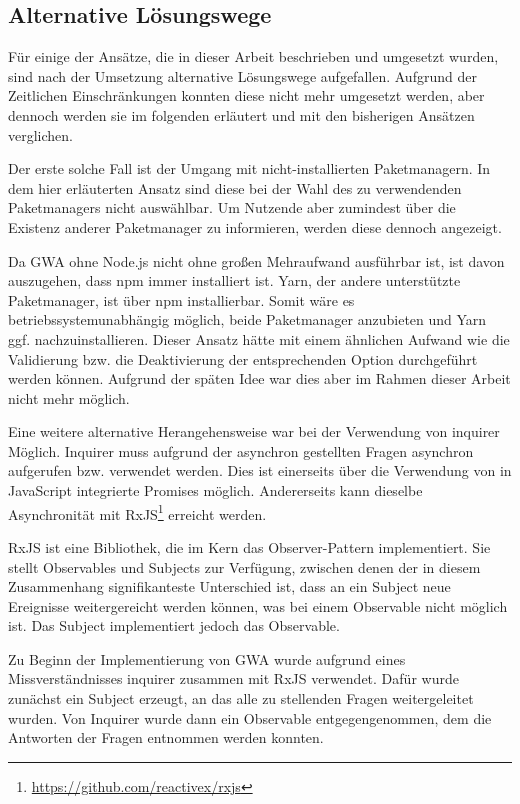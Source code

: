 \subsection{Alternative Lösungswege}
Für einige der Ansätze, die in dieser Arbeit beschrieben und umgesetzt wurden, sind nach der Umsetzung alternative Lösungswege aufgefallen. Aufgrund der Zeitlichen Einschränkungen konnten diese nicht mehr umgesetzt werden, aber dennoch werden sie im folgenden erläutert und mit den bisherigen Ansätzen verglichen.

Der erste solche Fall ist der Umgang mit nicht-installierten Paketmanagern. In dem hier erläuterten Ansatz sind diese bei der Wahl des zu verwendenden Paketmanagers nicht auswählbar. Um Nutzende aber zumindest über die Existenz anderer Paketmanager zu informieren, werden diese dennoch angezeigt.

Da \gls{GWA} ohne Node.js nicht ohne großen Mehraufwand ausführbar ist, ist davon auszugehen, dass \gls{npm} immer installiert ist. Yarn, der andere unterstützte Paketmanager, ist über \gls{npm} installierbar. Somit wäre es betriebssystemunabhängig möglich, beide Paketmanager anzubieten und Yarn ggf. nachzuinstallieren. Dieser Ansatz hätte mit einem ähnlichen Aufwand wie die Validierung bzw. die Deaktivierung der entsprechenden Option durchgeführt werden können. Aufgrund der späten Idee war dies aber im Rahmen dieser Arbeit nicht mehr möglich.

Eine weitere alternative Herangehensweise war bei der Verwendung von inquirer Möglich. Inquirer muss aufgrund der asynchron gestellten Fragen asynchron aufgerufen bzw. verwendet werden. Dies ist einerseits über die Verwendung von in JavaScript integrierte Promises möglich. Andererseits kann dieselbe Asynchronität mit RxJS\footnote{\url{https://github.com/reactivex/rxjs}} erreicht werden.

RxJS ist eine Bibliothek, die im Kern das Observer-Pattern implementiert. Sie stellt Observables und Subjects zur Verfügung, zwischen denen der in diesem Zusammenhang signifikanteste Unterschied ist, dass an ein Subject neue Ereignisse weitergereicht werden können, was bei einem Observable nicht möglich ist. Das Subject implementiert jedoch das Observable.

Zu Beginn der Implementierung von \gls{GWA} wurde aufgrund eines Missverständnisses inquirer zusammen mit RxJS verwendet. Dafür wurde zunächst ein Subject erzeugt, an das alle zu stellenden Fragen weitergeleitet wurden. Von Inquirer wurde dann ein Observable entgegengenommen, dem die Antworten der Fragen entnommen werden konnten.


